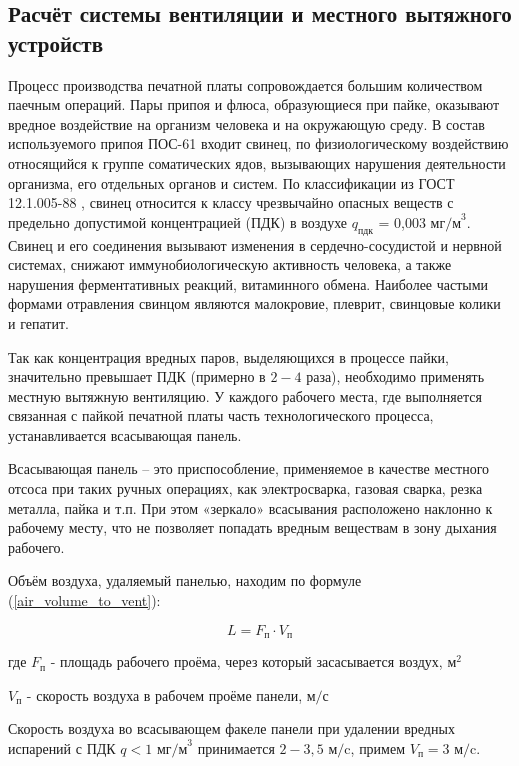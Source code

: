 \newpage

\subsection{Расчёт системы вентиляции и местного вытяжного устройств}

Процесс производства печатной платы сопровождается большим количеством паечным
операций.
Пары припоя и флюса, образующиеся при пайке, оказывают вредное воздействие на
организм человека и на окружающую среду. В состав используемого припоя ПОС-61
входит свинец, по физиологическому воздействию относящийся к группе соматических
ядов, вызывающих нарушения деятельности организма, его отдельных органов и систем.
По классификации из ГОСТ 12.1.005-88 \cite{ecology_gost_005_88}, свинец относится
к классу чрезвычайно опасных веществ с предельно допустимой концентрацией (ПДК)
в воздухе $q_\text{пдк}$ = 0,003 $\text{мг/м}^3$.
Свинец и его соединения вызывают изменения в сердечно-сосудистой и нервной системах,
снижают иммунобиологическую активность человека, а также нарушения ферментативных
реакций, витаминного обмена. Наиболее частыми формами отравления свинцом являются
малокровие, плеврит, свинцовые колики и гепатит.

Так как концентрация вредных паров, выделяющихся в процессе пайки, значительно
превышает ПДК (примерно в $2 - 4$ раза), необходимо применять местную вытяжную вентиляцию.
У каждого рабочего места, где выполняется связанная с пайкой печатной платы часть
технологического процесса, устанавливается всасывающая панель.

Всасывающая панель – это приспособление, применяемое в качестве местного отсоса
при таких ручных операциях, как электросварка, газовая сварка, резка металла,
пайка и т.п. При этом «зеркало» всасывания расположено наклонно к рабочему месту,
что не позволяет попадать вредным веществам в зону дыхания рабочего.

Объём воздуха, удаляемый панелью, находим по формуле (\ref{air_volume_to_vent}):

\begin{equation}
\label{air_volume_to_vent}
    L = F_\text{п} \cdot V_\text{п}
\end{equation}

где $F_\text{п}$ - площадь рабочего проёма, через который засасывается воздух, $\text{м}^2$

$V_\text{п}$ - скорость воздуха в рабочем проёме панели, $\text{м/с}$

Скорость воздуха во всасывающем факеле панели при удалении вредных испарений с
ПДК $q < 1$ $\text{мг/м}^3$ \cite[табл. 1.1]{local_vent_spot_calc_method} принимается
$2 - 3,5 \text{ м/c}$, примем $V_\text{п} = 3 \text{ м/c}$.

